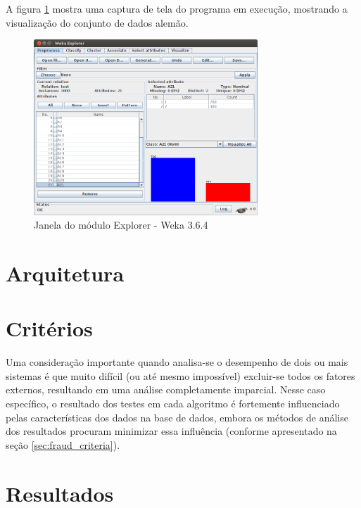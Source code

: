 A figura \ref{fig:prop_weka} mostra uma captura de tela do programa em execução, mostrando a visualização do conjunto de dados alemão.

\begin{figure}[h!]
\centering
\includegraphics[width=0.75\textwidth]{img/weka.png}
\caption{Janela do módulo Explorer - Weka 3.6.4}
\label{fig:prop_weka}
\end{figure}

\section{Arquitetura}

\section{Critérios}

Uma consideração importante quando analisa-se o desempenho de dois ou mais sistemas é que muito difícil (ou até mesmo impossível) excluir-se todos os fatores externos, resultando em uma análise completamente imparcial. Nesse caso específico, o resultado dos testes em cada algoritmo é fortemente influenciado pelas características dos dados na base de dados, embora os métodos de análise dos resultados procuram minimizar essa influência (conforme apresentado na seção \ref{sec:fraud_criteria}).

\section{Resultados}

